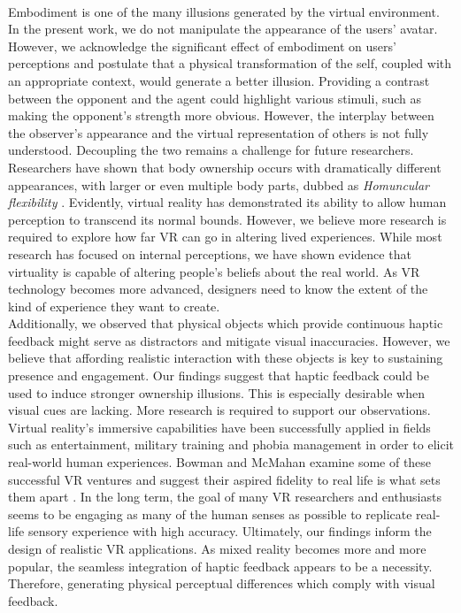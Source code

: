  \\
Embodiment is one of the many illusions generated by the virtual environment. In the present work, we do not manipulate the appearance of the users' avatar. However, we acknowledge the significant effect of embodiment on users' perceptions and postulate that a physical transformation of the self, coupled with an appropriate context, would generate a better illusion. Providing a contrast between the opponent and the agent could highlight various stimuli, such as making the opponent's strength more obvious. However, the interplay between the observer's appearance and the virtual representation of others is not fully understood. Decoupling the two remains a challenge for future researchers.
\\
Researchers have shown that body ownership occurs with dramatically different appearances, with larger or even multiple body parts, dubbed as \textit{Homuncular flexibility} \cite{normand2011multisensory, won2015homuncular}. Evidently, virtual reality has demonstrated its ability to allow human perception to transcend its normal bounds. However, we believe more research is required to explore how far VR can go in altering lived experiences. While most research has focused on internal perceptions, we have shown evidence that virtuality is capable of altering people's beliefs about the real world. As VR technology becomes more advanced, designers need to know the extent of the kind of experience they want to create.
\\
Additionally, we observed that physical objects which provide continuous haptic feedback might serve as distractors and mitigate visual inaccuracies. However, we believe that affording realistic interaction with these objects is key to sustaining presence and engagement. Our findings suggest that haptic feedback could be used to induce stronger ownership illusions. This is especially desirable when visual cues are lacking. More research is required to support our observations.
\\
 Virtual reality's immersive capabilities have been successfully applied in fields such as entertainment, military training and phobia management in order to elicit real-world human experiences. Bowman and McMahan examine some of these successful VR ventures and suggest their aspired fidelity to real life is what sets them apart \cite{bowman2007virtual}. In the long term, the goal of many VR researchers and enthusiasts seems to be engaging as many of the human senses as possible to replicate real-life sensory experience with high accuracy. Ultimately, our findings inform the design of realistic VR applications. As mixed reality becomes more and more popular, the seamless integration of haptic feedback appears to be a necessity. Therefore, generating physical perceptual differences which comply with visual feedback.
 